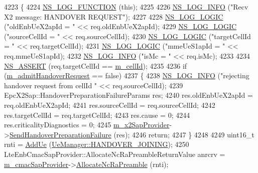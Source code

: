 \begin{DoxyCode}
4223 \{
4224   \hyperlink{log-macros-disabled_8h_a90b90d5bad1f39cb1b64923ea94c0761}{NS\_LOG\_FUNCTION} (\textcolor{keyword}{this});
4225 
4226   \hyperlink{group__logging_gafbd73ee2cf9f26b319f49086d8e860fb}{NS\_LOG\_INFO} (\textcolor{stringliteral}{"Recv X2 message: HANDOVER REQUEST"});
4227 
4228   \hyperlink{group__logging_ga88acd260151caf2db9c0fc84997f45ce}{NS\_LOG\_LOGIC} (\textcolor{stringliteral}{"oldEnbUeX2apId = "} << req.oldEnbUeX2apId);
4229   \hyperlink{group__logging_ga88acd260151caf2db9c0fc84997f45ce}{NS\_LOG\_LOGIC} (\textcolor{stringliteral}{"sourceCellId = "} << req.sourceCellId);
4230   \hyperlink{group__logging_ga88acd260151caf2db9c0fc84997f45ce}{NS\_LOG\_LOGIC} (\textcolor{stringliteral}{"targetCellId = "} << req.targetCellId);
4231   \hyperlink{group__logging_ga88acd260151caf2db9c0fc84997f45ce}{NS\_LOG\_LOGIC} (\textcolor{stringliteral}{"mmeUeS1apId = "} << req.mmeUeS1apId);
4232   \hyperlink{group__logging_gafbd73ee2cf9f26b319f49086d8e860fb}{NS\_LOG\_INFO} (\textcolor{stringliteral}{"isMc = "} << req.isMc);
4233 
4234   \hyperlink{assert_8h_a6dccdb0de9b252f60088ce281c49d052}{NS\_ASSERT} (req.targetCellId == \hyperlink{classns3_1_1LteEnbRrc_a4ced331e168e6c1aeca0bb11be19b8c7}{m\_cellId});
4235 
4236   \textcolor{keywordflow}{if} (\hyperlink{classns3_1_1LteEnbRrc_a727e2ef6a1438fce36c1d6236180364b}{m\_admitHandoverRequest} == \textcolor{keyword}{false})
4237     \{
4238       \hyperlink{group__logging_gafbd73ee2cf9f26b319f49086d8e860fb}{NS\_LOG\_INFO} (\textcolor{stringliteral}{"rejecting handover request from cellId "} << req.sourceCellId);
4239       EpcX2Sap::HandoverPreparationFailureParams res;
4240       res.oldEnbUeX2apId =  req.oldEnbUeX2apId;
4241       res.sourceCellId = req.sourceCellId;
4242       res.targetCellId = req.targetCellId;
4243       res.cause = 0;
4244       res.criticalityDiagnostics = 0;
4245       \hyperlink{classns3_1_1LteEnbRrc_ae8dc75f4f6f63b7736d86204a4beb415}{m\_x2SapProvider}->\hyperlink{classns3_1_1EpcX2SapProvider_ab88e7c840efe967b8a7514d357991e2b}{SendHandoverPreparationFailure} (res);
4246       \textcolor{keywordflow}{return};
4247     \}
4248 
4249   uint16\_t rnti = \hyperlink{classns3_1_1LteEnbRrc_a7e7972444b688ab643bb1ff3122012d3}{AddUe} (\hyperlink{classns3_1_1UeManager_a2f4085fdd18d7125c27da44a5b8b6808a093669f7255c35aa11645ba004a896ea}{UeManager::HANDOVER\_JOINING});
4250   LteEnbCmacSapProvider::AllocateNcRaPreambleReturnValue anrcrv = 
      \hyperlink{classns3_1_1LteEnbRrc_ae5bd011924ef4e221d19d705d6663e8b}{m\_cmacSapProvider}->\hyperlink{classns3_1_1LteEnbCmacSapProvider_a6a5be04fd0a0de8a5df57625911ecd35}{AllocateNcRaPreamble} (rnti);

\end{DoxyCode}
